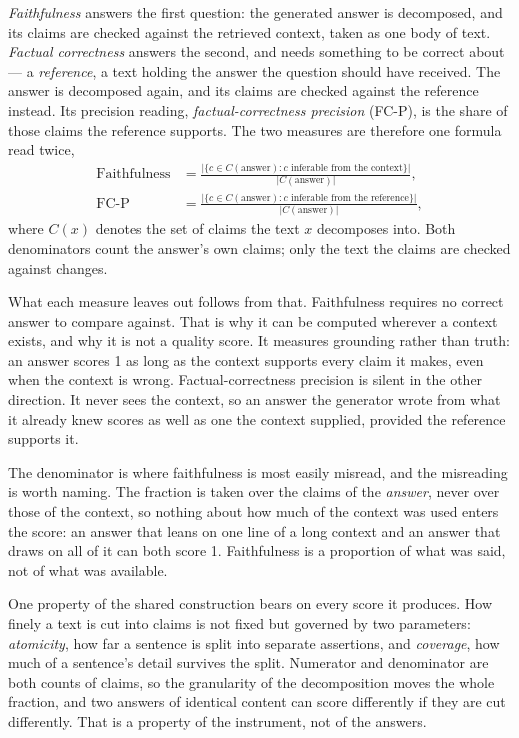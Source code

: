 \emph{Faithfulness} answers the first question: the generated answer is
decomposed, and its claims are checked against the retrieved context, taken as one
body of text. \emph{Factual correctness} answers the second, and needs something
to be correct about --- a \emph{reference}, a text holding the answer the question
should have received. The answer is decomposed again, and its claims are checked
against the reference instead. Its precision reading,
\emph{factual-correctness precision} (FC-P), is the share of those claims the
reference supports. The two measures are therefore one formula read twice,
\begin{equation}
\begin{aligned}
\mathrm{Faithfulness} &=
\frac{\bigl|\{c \in C(\text{answer}) : c \text{ inferable from the context}\}\bigr|}
     {\bigl|C(\text{answer})\bigr|} ,\\[6pt]
\text{FC-P} &=
\frac{\bigl|\{c \in C(\text{answer}) : c \text{ inferable from the reference}\}\bigr|}
     {\bigl|C(\text{answer})\bigr|} ,
\end{aligned}
\end{equation}
where $C(x)$ denotes the set of claims the text $x$ decomposes into. Both
denominators count the answer's own claims; only the text the claims are checked
against changes.

What each measure leaves out follows from that. Faithfulness requires no correct
answer to compare against. That is why it can be computed wherever a context
exists, and why it is not a quality score. It measures grounding rather than
truth: an answer scores 1 as long as the context supports every claim it makes,
even when the context is wrong. Factual-correctness precision is silent in the
other direction. It never sees the context, so an answer the generator wrote from
what it already knew scores as well as one the context supplied, provided the
reference supports it.

The denominator is where faithfulness is most easily misread, and the misreading
is worth naming. The fraction is taken over the claims of the \emph{answer}, never
over those of the context, so nothing about how much of the context was used
enters the score: an answer that leans on one line of a long context and an answer
that draws on all of it can both score 1. Faithfulness is a proportion of what was
said, not of what was available.

One property of the shared construction bears on every score it produces. How
finely a text is cut into claims is not fixed but governed by two parameters:
\emph{atomicity}, how far a sentence is split into separate assertions, and
\emph{coverage}, how much of a sentence's detail survives the split. Numerator and
denominator are both counts of claims, so the granularity of the decomposition
moves the whole fraction, and two answers of identical content can score
differently if they are cut differently. That is a property of the instrument, not
of the answers.

